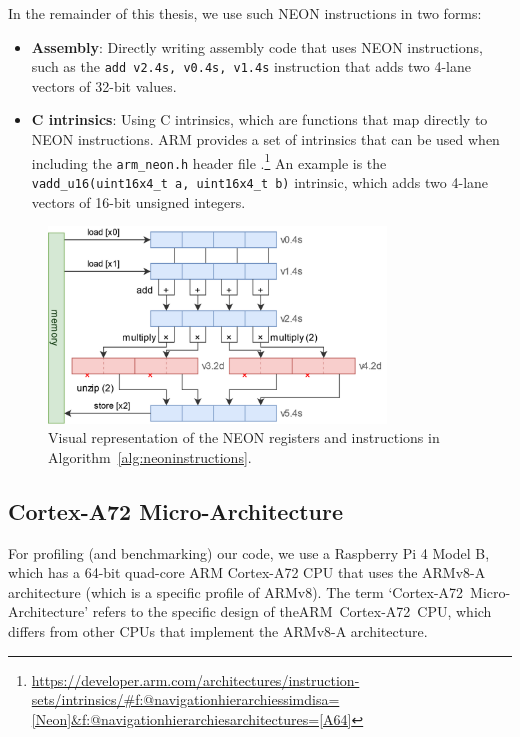 \documentclass[11pt,a4paper]{report}
\theoremstyle{definition}
\begin{document}
\begin{algorithm}
  \caption{NEON instruction example (assembly)}
  \label{alg:neoninstructions}
  Assembler}, style=ASMStyle]{code/neon_example_asm.s}
\end{algorithm}

In the remainder of this thesis, we use such NEON instructions in two forms:
\begin{itemize}
  \item \textbf{Assembly}: Directly writing assembly code that uses NEON instructions, such as the \texttt{add v2.4s, v0.4s, v1.4s} instruction that adds two 4-lane vectors of 32-bit values.
  \item \textbf{C intrinsics}: Using C intrinsics, which are functions that map directly to NEON instructions. ARM provides a set of intrinsics that can be used when including the \texttt{arm\_neon.h} header file \cite{ArmNeonIntrinsicsRef}.\footnote{\url{https://developer.arm.com/architectures/instruction-sets/intrinsics/\#f:@navigationhierarchiessimdisa=[Neon]\&f:@navigationhierarchiesarchitectures=[A64]}} An example is the \texttt{vadd\_u16(uint16x4\_t a, uint16x4\_t b)} intrinsic, which adds two 4-lane vectors of 16-bit unsigned integers.
\end{itemize}

\begin{figure}
  \centering
  \includegraphics[width=0.8\textwidth]{neon/neon_example.drawio.png}
  \caption{Visual representation of the NEON registers and instructions in Algorithm~\ref{alg:neoninstructions}.}
  \label{fig:neonexample}
\end{figure}

\subsection{Cortex-A72 Micro-Architecture}
For profiling (and benchmarking) our code, we use a Raspberry Pi 4 Model B, which has a 64-bit quad-core ARM Cortex-A72 CPU that uses the \mbox{ARMv8-A} architecture (which is a specific profile of ARMv8). The term \mbox{`Cortex-A72 Micro-Architecture'} refers to the specific design of the\linebreak \mbox{ARM Cortex-A72 CPU}, which differs from other CPUs that implement the \mbox{ARMv8-A} architecture.
\end{document}
